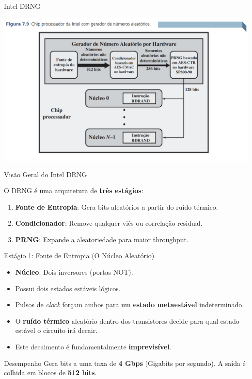 \begin{frame}{Intel DRNG}

    \centering
    \includegraphics[width=0.9\linewidth]{Figuras/gerador-numero-aleatorio-intel.png}


\end{frame}


\begin{frame}{Visão Geral do Intel DRNG}

    O DRNG é uma arquitetura de \textbf{três estágios}:
    \begin{enumerate}
        \item \textbf{Fonte de Entropia}: Gera bits aleatórios a partir do ruído térmico.
        \item \textbf{Condicionador}: Remove qualquer viés ou correlação residual.
        \item \textbf{PRNG}: Expande a aleatoriedade para maior throughput.
    \end{enumerate}
\end{frame}


\begin{frame}{Estágio 1: Fonte de Entropia (O Núcleo Aleatório)}

    \begin{itemize}
        \item \textbf{Núcleo}: Dois inversores (portas NOT).
        \item Possui dois estados estáveis lógicos.
        \item Pulsos de \textit{clock} forçam ambos para um \textbf{estado metaestável} indeterminado.
        \item O \textbf{ruído térmico} aleatório dentro dos transistores decide para qual estado estável o circuito irá decair.
        \item Este decaimento é fundamentalmente \textbf{imprevisível}.
    \end{itemize}
    \vspace{0.5cm}
    \begin{block}{Desempenho}
        Gera bits a uma taxa de \textbf{4 Gbps} (Gigabits por segundo). A saída é colhida em blocos de \textbf{512 bits}.
    \end{block}
\end{frame}

